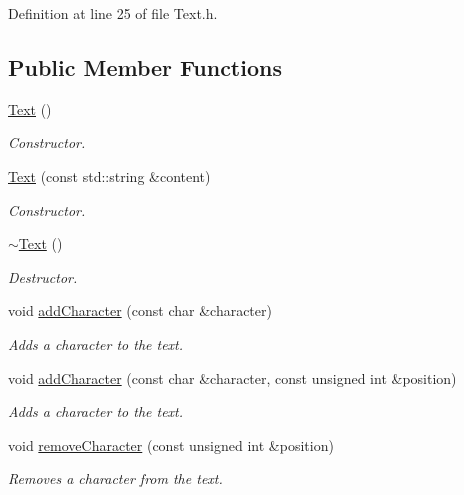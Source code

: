 Definition at line 25 of file Text.h.\subsection*{Public Member Functions}
\begin{CompactItemize}
\item 
\hyperlink{class_text_b3e26143fccc52699bcc5149cae852bc}{Text} ()
\begin{CompactList}\small\item\em Constructor. \item\end{CompactList}\item 
\hyperlink{class_text_d8c7b52db022f4351e31b2b7609a8180}{Text} (const std::string \&content)
\begin{CompactList}\small\item\em Constructor. \item\end{CompactList}\item 
\hyperlink{class_text_2d49e5c280e205125b149f7777ae30c7}{$\sim$Text} ()
\begin{CompactList}\small\item\em Destructor. \item\end{CompactList}\item 
void \hyperlink{class_text_6e6da63c90af68639adc7dd1336f6bf9}{addCharacter} (const char \&character)
\begin{CompactList}\small\item\em Adds a character to the text. \item\end{CompactList}\item 
void \hyperlink{class_text_fdd11ad0c90ca483d4cff3d74a64da9e}{addCharacter} (const char \&character, const unsigned int \&position)
\begin{CompactList}\small\item\em Adds a character to the text. \item\end{CompactList}\item 
void \hyperlink{class_text_e04500eeada2a4a3bb00554b32263c52}{removeCharacter} (const unsigned int \&position)
\begin{CompactList}\small\item\em Removes a character from the text. \item\end{CompactList}\item 

\end{CompactItemize}
